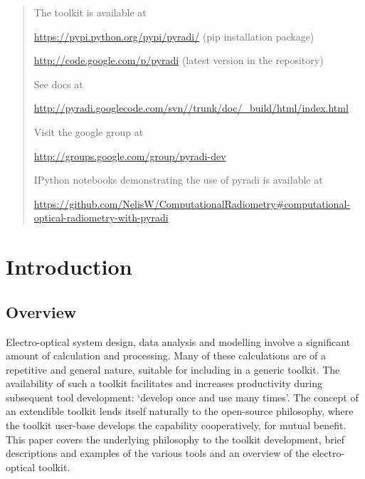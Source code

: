 \documentclass[a4paper,10pt,english]{sphinxmanual}
\begin{document}
\begin{quote}

\begin{DUlineblock}{0em}
\item[] The toolkit is available at
\item[] \href{https://pypi.python.org/pypi/pyradi/}{https://pypi.python.org/pypi/pyradi/} (pip installation package)
\item[] \href{http://code.google.com/p/pyradi}{http://code.google.com/p/pyradi} (latest version in the repository)
\end{DUlineblock}

\begin{DUlineblock}{0em}
\item[] See docs at 
\item[] \href{http://pyradi.googlecode.com/svn//trunk/doc/\_build/html/index.html}{http://pyradi.googlecode.com/svn//trunk/doc/\_build/html/index.html}
\end{DUlineblock}

\begin{DUlineblock}{0em}
\item[] Visit the google group at 
\item[] \href{http://groups.google.com/group/pyradi-dev}{http://groups.google.com/group/pyradi-dev}
\end{DUlineblock}

\begin{DUlineblock}{0em}
\item[] IPython notebooks demonstrating the use of pyradi is available at  
\item[] \href{https://github.com/NelisW/ComputationalRadiometry\#computational-optical-radiometry-with-pyradi}{https://github.com/NelisW/ComputationalRadiometry\#computational-optical-radiometry-with-pyradi}
\end{DUlineblock}
\end{quote}


\chapter{Introduction}
\label{introduction:introduction}\label{introduction::doc}\label{introduction:welcome-to-pyradi-s-documentation}

\section{Overview}
\label{introduction:overview}
Electro-optical system design, data analysis and modelling involve a significant
amount of calculation and processing. Many of these calculations are of a
repetitive and general nature, suitable for including in a generic toolkit.
The availability of such a toolkit facilitates and increases productivity
during subsequent tool development: `develop once and use many times'. The
concept of an extendible toolkit lends itself naturally to the open-source
philosophy, where the toolkit user-base develops the capability cooperatively,
for mutual benefit. This paper covers the underlying philosophy to the toolkit
development, brief descriptions and examples of the various tools and an
overview of the electro-optical toolkit.
\end{document}
